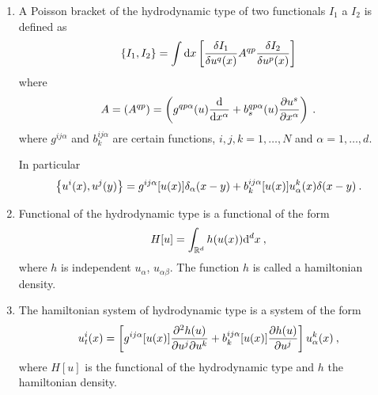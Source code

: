 \begin{definition}
    \begin{enumerate}
        \item A Poisson bracket of the hydrodynamic type of two functionals $I_1$ a $I_2$ is defined as
        \begin{align}
            \left \lbrace I_1,I_2 \right \rbrace = \int \mathrm{d} x 
            \left[ \frac{\delta I_1}{\delta u^q(x)} A^{qp} \frac{\delta I_2}{\delta u^p(x)} \right]
        \end{align}
        where
        \begin{align}
            A = (A^{qp}) = \left( g^{qp \alpha}(u) \frac{\mathrm{d}}{\mathrm{d}x^\alpha} + b^{qp\alpha}_s(u) \frac{\partial u^s}{\partial x^\alpha} \right) \:.
        \end{align}
        where $g^{ij \alpha}$ and $b_k^{ij \alpha}$ are certain functions, $i,j,k = 1, \dots, N$ and $\alpha = 1, \dots, d $.

        In particular
        \begin{align}
            \left \lbrace u^i(x), u^j(y) \right \rbrace = g^{ij \alpha} [u(x)] \delta_\alpha(x-y) + b_k^{ij \alpha} [u(x)] u_\alpha^k(x) \delta(x-y) \:.
        \end{align}
        
        \item Functional of the hydrodynamic type is a functional of the form
        \begin{align}
            H[u] = \int_{\mathbb{R}^d} h(u(x)) \mathrm{d}^d x \:,
        \end{align}
        where $h$ is independent $u_\alpha$, $u_{\alpha \beta}$. The function $h$ is called a hamiltonian density.

        \item The hamiltonian system of hydrodynamic type is a system of the form
        \begin{align}
            u^i_t (x) = 
            \left[ g^{ij \alpha} [u(x)] \frac{\partial^2 h(u)}{\partial u^j \partial u^k} + b_k^{ij \alpha} [u(x)] \frac{\partial h(u)}{\partial u^j} \right] u_\alpha^k(x) \:,
        \end{align}
        where $H[u]$ is the functional of the hydrodynamic type and $h$ the hamiltonian density.
    \end{enumerate}
\end{definition}

